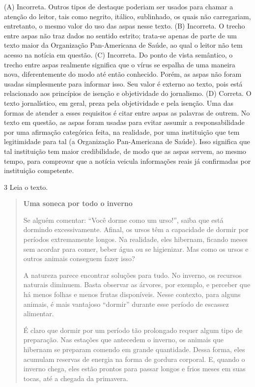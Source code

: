 (A) Incorreta. Outros tipos de destaque poderiam ser usados para chamar
a atenção do leitor, tais como negrito, itálico, sublinhado, os quais
não carregariam, entretanto, o mesmo valor do uso das aspas nesse texto.
(B) Incorreta. O trecho entre aspas não traz dados no sentido estrito;
trata-se apenas de parte de um texto maior da Organização Pan-Americana
de Saúde, ao qual o leitor não tem acesso na notícia em questão. (C)
Incorreta. Do ponto de vista semântico, o trecho entre aspas realmente
significa que o vírus se espalha de uma maneira nova, diferentemente do
modo até então conhecido. Porém, as aspas não foram usadas simplesmente
para informar isso. Seu valor é externo ao texto, pois está relacionado
aos princípios de isenção e objetividade do jornalismo. (D) Correta. O
texto jornalístico, em geral, preza pela objetividade e pela isenção.
Uma das formas de atender a esses requisitos é citar entre aspas as
palavras de outrem. No texto em questão, as aspas foram usadas para
evitar assumir a responsabilidade por uma afirmação categórica feita, na
realidade, por uma instituição que tem legitimidade para tal (a
Organização Pan-Americana de Saúde). Isso significa que tal instituição
tem maior credibilidade, de modo que as aspas servem, ao mesmo tempo,
para comprovar que a notícia veicula informações reais já confirmadas
por instituição competente.

\num{3} Leia o texto.

\begin{quote}
\textbf{Uma soneca por todo o inverno}

Se alguém comentar: ``Você dorme como um urso!'', saiba que está
dormindo excessivamente. Afinal, os ursos têm a capacidade de dormir por
períodos extremamente longos. Na realidade, eles hibernam, ficando meses
sem acordar para comer, beber água ou se higienizar. Mas como os ursos e
outros animais conseguem fazer isso?

A natureza parece encontrar soluções para tudo. No inverno, os recursos
naturais diminuem. Basta observar as árvores, por exemplo, e perceber
que há menos folhas e menos frutas disponíveis. Nesse contexto, para
alguns animais, é mais vantajoso ``dormir'' durante esse período de
escassez alimentar.

É claro que dormir por um período tão prolongado requer algum tipo de
preparação. Nas estações que antecedem o inverno, os animais que
hibernam se preparam comendo em grande quantidade. Dessa forma, eles
acumulam reservas de energia na forma de gordura corporal. E, quando o
inverno chega, eles estão prontos para passar longos e frios meses em
suas tocas, até a chegada da primavera.
\end{quote}

